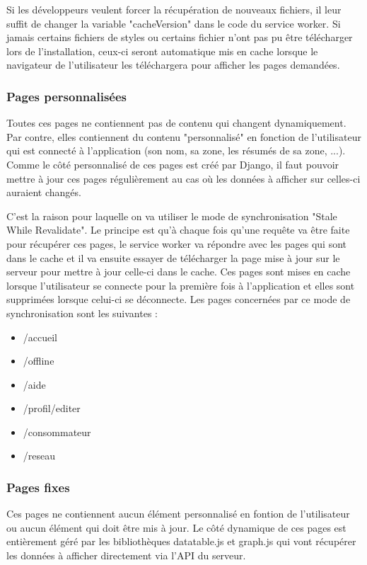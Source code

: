 \documentclass{EPL-master-thesis-covers-FR}
\begin{document}
					Si les développeurs veulent forcer la récupération de nouveaux fichiers, il leur suffit de changer la variable "cacheVersion" dans le code du service worker. Si jamais certains fichiers de styles ou certains fichier n'ont pas pu être télécharger lors de l'installation, ceux-ci seront automatique mis en cache lorsque le navigateur de l'utilisateur les téléchargera pour afficher les pages demandées.
					
					
				\subsubsection*{Pages personnalisées}				
				 	Toutes ces pages ne contiennent pas de contenu qui changent dynamiquement. Par contre, elles contiennent du contenu "personnalisé" en fonction de l'utilisateur qui est connecté à l'application (son nom, sa zone, les résumés de sa zone, ...). Comme le côté personnalisé de ces pages est créé par Django, il faut pouvoir mettre à jour ces pages régulièrement au cas où les données à afficher sur celles-ci auraient changés. 
				 	
				 	C'est la raison pour laquelle on va utiliser le mode de synchronisation "Stale While Revalidate". Le principe est qu'à chaque fois qu'une requête va être faite pour récupérer ces pages, le service worker va répondre avec les pages qui sont dans le cache et il va ensuite essayer de télécharger la page mise à jour sur le serveur pour mettre à jour celle-ci dans le cache. Ces pages sont mises en cache lorsque l'utilisateur se connecte pour la première fois à l'application et elles sont supprimées lorsque celui-ci se déconnecte. Les pages concernées par ce mode de synchronisation sont les suivantes :
				 	\begin{itemize}
				 		\item /accueil
				 		\item /offline
				 		\item /aide
				 		\item /profil/editer
				 		\item /consommateur
				 		\item /reseau
				 	\end{itemize}
				 	
				\subsubsection*{Pages fixes} 
					Ces pages ne contiennent aucun élément personnalisé en fontion de l'utilisateur ou aucun élément qui doit être mis à jour. Le côté dynamique de ces pages est entièrement géré par les bibliothèques datatable.js et graph.js qui vont récupérer les données à afficher directement via l'API du serveur.
				
\end{document}
